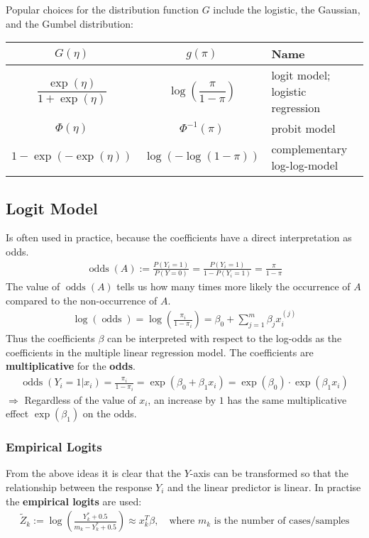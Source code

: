 Popular choices for the distribution function $G$ include the logistic,
the Gaussian,
and the Gumbel distribution:
\begin{tabular}{c c l}
\hline
$G(\eta)$    & $g(\pi)$         & Name
\\\hline
$\dfrac{\exp(\eta)}{1 + \exp(\eta)}$
             &
$\log\left(\dfrac{\pi}{1-\pi}\right)$
             &
logit model; logistic regression
\\
$\Phi(\eta)$ & $\Phi^{-1}(\pi)$ & probit model
\\
$1 - \exp(-\exp(\eta))$
             &
$\log(-\log(1 - \pi))$
             &
complementary log-log-model
\\\hline
\end{tabular}

\subsection{Logit Model}
Is often used in practice,
because the coefficients have a direct interpretation as odds.
\begin{align*}
\operatorname{odds}(A)
:=
\frac{P(Y_i=1)}{P(Y=0)}
=
\frac{P(Y_i=1)}{1 - P(Y_i=1)}
=
\frac{\pi}{1 - \pi}
\end{align*}
The value of $\operatorname{odds}(A)$ tells us how many times more likely
the occurrence of $A$ compared to the non-occurrence of $A$.
\begin{align*}
\log\left(\operatorname{odds}\right)
=
\log\left(\frac{\pi_i}{1-\pi_i}\right)
=
\beta_0 + \sum_{j=1}^m \beta_j x_i^{(j)}
\end{align*}
Thus the coefficients $\beta$ can be interpreted with respect to the log-odds
as the coefficients in the multiple linear regression model.
The coefficients are \textbf{multiplicative} for the \textbf{odds}.
\begin{align*}
\operatorname{odds}\left(Y_i=1 | x_i\right)
=
\frac{\pi_i}{1 - \pi_i}
=
\exp\left(\beta_0 + \beta_1 x_i\right)
=
\exp\left(\beta_0\right) \cdot \exp\left(\beta_1 x_i\right)
\end{align*}
$\Rightarrow$ Regardless of the value of $x_i$,
an increase by $1$ has the same multiplicative effect $\exp(\beta_1)$
on the odds.

\subsubsection{Empirical Logits}
From the above ideas it is clear that the $Y$-axis can be transformed
so that the relationship between the response $Y_i$ and
the linear predictor is linear.
In practise the \textbf{empirical logits} are used:
\begin{align*}
\widetilde{Z}_k
:=
\log\left(\frac{Y_k^* + 0.5}{m_k - Y_k^* + 0.5}\right)
\approx
x_k^T \beta
,\quad
\text{where $m_k$ is the number of cases/samples}
\end{align*}

